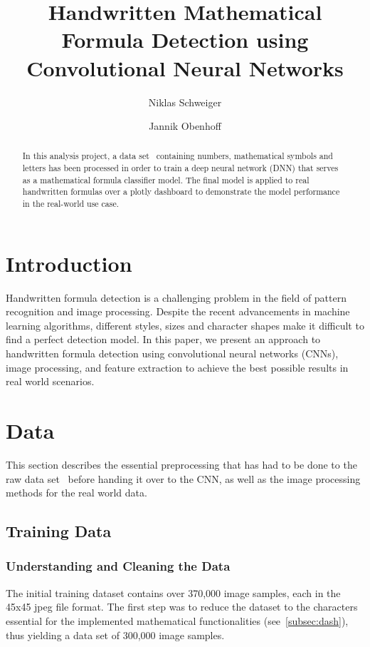 \documentclass[@CLASSOPTIONS@]{tumarticle}
\title{Handwritten Mathematical Formula Detection using Convolutional Neural Networks}
\author[affil={1}, email={niklas.schweiger@tum.de}]{Niklas Schweiger}
\author[affil={1}, email={jannik.obenhoff@tum.de}]{Jannik Obenhoff}
\affil{Department of Electrical and Computer Engineering, Technical
  University of Munich, Arcisstr. 21, 80333 Munich, Germany}
\begin{document}
\twocolumn

\maketitle
\begin{abstract}
  In this analysis project, a data set~\cite{kaggledataset} containing numbers, mathematical
  symbols and letters has been processed in order to train a deep neural network (DNN) that
  serves as a mathematical formula classifier model.
  The final model is applied to real handwritten formulas over a plotly dashboard to demonstrate the model
  performance in the real-world use case.

\end{abstract}

\section{Introduction}

Handwritten formula detection is a challenging problem in the field of pattern recognition and
image processing.
Despite the recent advancements in machine learning algorithms, different styles, sizes and character
shapes make it difficult to find a perfect detection model.
In this paper, we present an approach to handwritten formula detection using convolutional
neural networks (CNNs), image processing, and feature extraction to achieve the best possible results
in real world scenarios.

\section{Data}
\label{sec:measures}

This section describes the essential preprocessing that has had to be done to the raw
data set~\cite{kaggledataset} before handing it over to the CNN,
as well as the image processing methods for the real world data.

\subsection{Training Data}
\subsubsection{Understanding and Cleaning the Data}

The initial training dataset contains over 370,000 image samples, each in the 45x45 jpeg file format.
The first step was to reduce the dataset to the characters essential for the
implemented mathematical functionalities (see~\ref{subsec:dash}),
thus yielding a data set of 300,000 image samples.
\end{document}
